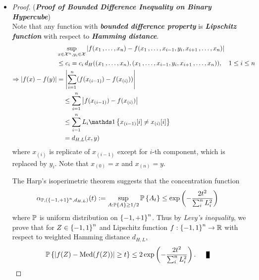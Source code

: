 \documentclass[11pt]{article}
\begin{document}
\begin{itemize}
\item \begin{proof} (\textbf{\emph{Proof of Bounded Difference Inequality on Binary Hypercube}}) \\
Note that any  function with \emph{\textbf{bounded difference property}} is \emph{\textbf{Lipschitz function}} with respect to \emph{\textbf{Hamming distance}}. 
\begin{align*}
&\sup_{x \in \cX^n, y_i \in \cX}\abs{f(x_1 \xdotx{,} x_n) - f(x_1 \xdotx{,} x_{i-1}, y_i, x_{i+1} \xdotx{,} x_{n})} &\\
&\le c_i = c_i\,d_{H}((x_1 \xdotx{,} x_n), (x_1 \xdotx{,} x_{i-1}, y_i, x_{i+1} \xdotx{,} x_{n})), \quad 1\le i \le n\\
\Rightarrow \abs{f(x) - f(y)} &=  \abs{\sum_{i=1}^{n}(f(x_{(i-1)}) - f(x_{(i)}) )}\\
&\quad \le  \sum_{i=1}^{n}\abs{f(x_{(i-1)}) - f(x_{(i)}) }\\
&\quad \le \sum_{i=1}^{n}L_i \ind{x_{(i-1)}[i] \neq x_{(i)}[i]} \\
&\quad = d_{H,L}(x, y)
\end{align*}   where $x_{(i)}$ is replicate of $x_{(i-1)}$ except for $i$-th component, which is replaced by $y_i$. Note that $x_{(0)} = x$ and $x_{(n)} = y$. 

The Harp's isoperimetric theorem suggests that the concentration function 
\begin{align*}
\alpha_{{\mathbb P}, (\left\{-1, +1\right\}^n, d_{H, L})}(t) := \sup_{A: {\mathbb P}\left\{A\right\} \ge 1/2}{\mathbb P}\left\{A_t\right\} &\le \exp\left(- \frac{2t^2}{\sum_i^{n}L_i^2}\right)
\end{align*} where ${\mathbb P}$ is uniform distribution on $\left\{-1, +1\right\}^n$. Thus by \emph{Levy's inequality}, we prove that for $Z \in \left\{-1, 1\right\}^n$ and Lipschitz function $f: \left\{-1, 1\right\}^n \to {\mathbb R}$ with respect to weighted Hamming distance $d_{H, L}$, 
\begin{align*}
\bP\set{\abs{f(Z) - \text{Med}(f(Z))} \ge t} &\le 2 \exp\paren{- \frac{2t^2}{\sum_i^{n}L_i^2}}. \qed
\end{align*} 
\end{proof}
\end{itemize}
\end{document}
